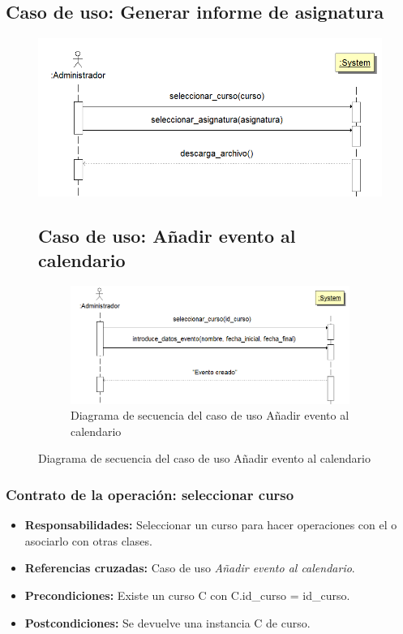 \documentclass{book}
\begin{document}
\subsection{Caso de uso: Generar informe de asignatura}
\begin{figure}[H] 
  \label{comportamiento-generar-informe} 
	\begin{center}
    \includegraphics[scale=0.5]{./secuencia-gen-informe.png}
  \end{center}
\caption{Diagrama de secuencia del caso de uso Generar informe de asignatura}

\subsection{Caso de uso: Añadir evento al calendario}
\begin{figure}[H] 
  \label{comportamiento-anadir-evento} 
	\begin{center}
    \includegraphics[scale=0.5]{./secuencia-crear-evento.png}
  \end{center}
\caption{Diagrama de secuencia del caso de uso Añadir evento al calendario}
\end{figure}
\end{figure}

\subsubsection{Contrato de la operación: seleccionar curso}
\begin{itemize}
\item {\bf Responsabilidades:} Seleccionar un curso para hacer operaciones con el o asociarlo con otras clases.
\item {\bf Referencias cruzadas:} Caso de uso {\em Añadir evento al calendario}.
\item {\bf Precondiciones:} Existe un curso C con C.id\_curso = id\_curso.
\item {\bf Postcondiciones:} Se devuelve una instancia C de curso.
\end{itemize}
\end{document}
